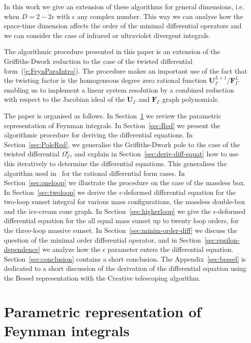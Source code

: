 \documentclass[a4paper,12pt]{article}
\numberwithin{equation}{section}
\numberwithin{figure}{section}
\begin{document}
In this work we give an extension of these algorithms for
general dimensions, i.e. when $D=2-2\epsilon$ with $\epsilon$ any
complex number.  This way we
can analyse how the space-time dimension affects the order of the
minimal differential operators and we can consider the case of infrared
or ultraviolet divergent integrals.

The algorithmic procedure presented in this paper is an extension of
the Griffiths-Dwork reduction to the case of the twisted differential
form~(\ref{e:FeynParaIntro}).  The procedure makes an important use of
the fact that the twisting factor is the homogeneous degree zero
rational function $\textbf{U}_\Gamma^{L+1}/\textbf{F}_\Gamma^L$
enabling us to implement a linear system resolution by a combined
reduction with respect to the Jacobian ideal of the
$\textbf{U}_\Gamma$ and $\textbf{F}_\Gamma$ graph polynomials.

The paper is organised as follows. 
In Section~\ref{sec:parametric} we review the parametric
representation of Feynman integrals. In Section~\ref{sec:Red} we
present the algorithmic procedure for deriving the differential
equations. In Section~\ref{sec:PoleRed},  we generalise the
Griffiths-Dwork pole to the case of the twisted differential
$\Omega_\Gamma^\epsilon$, and explain in
Section~\ref{sec:deriv-diff-equat} how to use this iteratively to
determine the differential equations. This generalises the algorithm
used in~\cite{Lairez:2022zkj} for the rational differential form cases. In Section~\ref{sec:oneloop} we
illustrate the procedure on the case of the massless box. In
Section~\ref{sec:twoloop} we derive the $\epsilon$-deformed
differential equation for the two-loop sunset integral for various
mass configurations, the massless double-box and the ice-cream cone
graph. In Section~\ref{sec:higherloop} we give the $\epsilon$-deformed
differential
equation for the all equal mass sunset up to twenty loop orders, for
the three-loop massive sunset. In Section~\ref{sec:minim-order-diff}
we discuss the question of the minimal order differential operator,
and in Section~\ref{sec:epsilon-dependence} we analyze how the
$\epsilon$ parameter enters the differential
equation. Section~\ref{sec:conclusion} contains a short
conclusion. The Appendix~\ref{sec:bessel} is dedicated to a short
discussion of the derivation of the differential equation using the
Bessel representation with the Creative telescoping algorithm.

\section{Parametric representation of Feynman integrals}
\label{sec:parametric}
\end{document}
